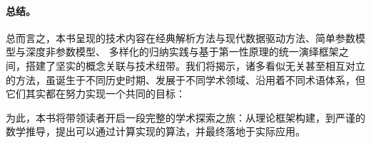 \documentclass[../../book-main_zh.tex]{subfiles}
\begin{document}
\paragraph{总结。}
总而言之，本书呈现的技术内容在经典解析方法与现代数据驱动方法、简单参数模型与深度非参数模型、
多样化的归纳实践与基于第一性原理的统一演绎框架之间，搭建了坚实的概念关联与技术纽带。我们将揭示，诸多看似无关甚至相互对立的方法，虽诞生于不同历史时期、发展于不同学术领域、沿用着不同术语体系，但它们其实都在努力实现一个共同的目标：
\begin{quote}
\end{quote}
为此，本书将带领读者开启一段完整的学术探索之旅：从理论框架构建，到严谨的数学推导，提出可以通过计算实现的算法，并最终落地于实际应用。
\end{document}
